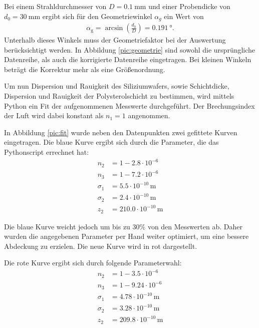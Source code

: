 Bei einem Strahldurchmesser von $D = \SI{0.1}{\milli\meter}$ und einer Probendicke von $d_0 = \SI{30}{\milli\meter}$ ergibt sich für den Geometriewinkel $\alpha_g$ ein Wert von
\begin{align}
	\alpha_\text{g} = \arcsin\left(\frac{d_0}{D}\right) = \SI{0.191}{\degree}.
\end{align}
Unterhalb dieses Winkels muss der Geometriefaktor bei der Auswertung berücksichtigt werden. In Abbildung \ref{pic:geometrie} sind sowohl die ursprüngliche Datenreihe, als auch die korrigierte Datenreihe eingetragen. Bei kleinen Winkeln beträgt die Korrektur mehr als eine Größenordnung.



Um nun Dispersion und Rauigkeit des Siliziumwafers, sowie Schichtdicke, Dispersion und Rauigkeit der Polysterolschicht zu bestimmen, wird mittels Python ein Fit der aufgenommenen Messwerte durchgeführt. Der Brechungsindex der Luft wird dabei konstant als $n_1=1$ angenommen.

In Abbildung \ref{pic:fit} wurde neben den Datenpunkten zwei gefittete Kurven eingetragen. Die blaue Kurve ergibt sich durch die Parameter, die das Pythonscript errechnet hat:
\begin{align*}
	n_2 &= 1-2.8\cdot 10^{-6}\\
	n_3 &= 1-7.2\cdot 10^{-6}\\
	\sigma_1 &= 5.5\cdot 10^{-10}\,\si{\meter} \\
	\sigma_2 &= 2.4\cdot 10^{-10}\,\si{\meter}\\
	z_2&= 210.0\cdot 10^{-10}\,\si{\meter}
\end{align*}

Die blaue Kurve weicht jedoch um bis zu 30\% von den Messwerten ab. Daher wurden die angegebenen Parameter per Hand weiter optimiert, um eine bessere Abdeckung zu erzielen. Die neue Kurve wird in rot dargestellt.


Die rote Kurve ergibt sich durch folgende Parameterwahl:
\begin{align*}
n_2 &= 1-3.5\cdot 10^{-6}\\
n_3 &= 1-9.24\cdot 10^{-6}\\
\sigma_1 &= 4.78\cdot 10^{-10}\,\si{\meter} \\
\sigma_2 &= 3.28\cdot 10^{-10}\,\si{\meter}\\
 z_2&= 209.8\cdot 10^{-10}\,\si{\meter}
\end{align*}

